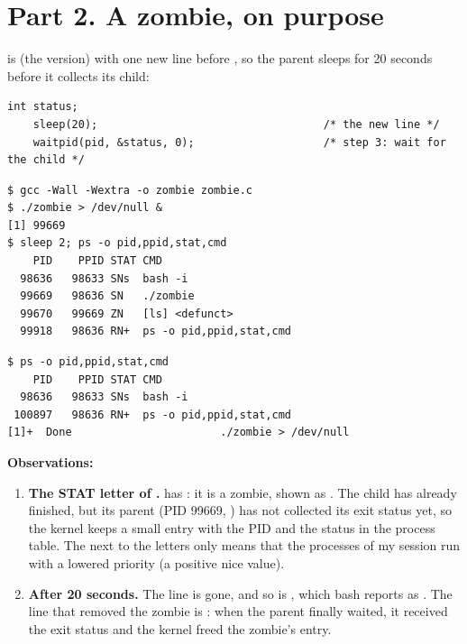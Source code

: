 \documentclass[11pt,a4paper]{article}
\begin{document}
\section{Part 2. A zombie, on purpose}

 is  (the  version) with one new line before
, so the parent sleeps for 20 seconds before it collects its child:

\begin{lstlisting}[style=ccode,firstnumber=23,caption={The change in zombie.c}]
    int status;
    sleep(20);                                   /* the new line */
    waitpid(pid, &status, 0);                    /* step 3: wait for the child */
\end{lstlisting}

\begin{lstlisting}[caption={The process table while the parent sleeps}]
$ gcc -Wall -Wextra -o zombie zombie.c
$ ./zombie > /dev/null &
[1] 99669
$ sleep 2; ps -o pid,ppid,stat,cmd
    PID    PPID STAT CMD
  98636   98633 SNs  bash -i
  99669   98636 SN   ./zombie
  99670   99669 ZN   [ls] <defunct>
  99918   98636 RN+  ps -o pid,ppid,stat,cmd
\end{lstlisting}

\begin{lstlisting}[caption={The process table after 20 seconds}]
$ ps -o pid,ppid,stat,cmd
    PID    PPID STAT CMD
  98636   98633 SNs  bash -i
 100897   98636 RN+  ps -o pid,ppid,stat,cmd
[1]+  Done                       ./zombie > /dev/null
\end{lstlisting}

\textbf{Observations:}
\begin{enumerate}
  \item \textbf{The STAT letter of .}  has : it is a zombie, shown as
  . The child has already finished, but its parent (PID 99669,
  ) has not collected its exit status yet, so the kernel keeps a small entry with
  the PID and the status in the process table. The  next to the letters only means that
  the processes of my session run with a lowered priority (a positive nice value).
  \item \textbf{After 20 seconds.} The  line is gone, and so is
  , which bash reports as . The line that removed the zombie is
  : when the parent finally waited, it received the exit status
  and the kernel freed the zombie's entry.
\end{enumerate}
\end{document}
